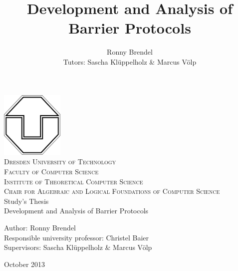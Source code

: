 \documentclass[a4paper, 10pt]{article}
\title{Development and Analysis of Barrier Protocols}
\author{Ronny Brendel\\Tutors: Sascha Kl\"uppelholz \& Marcus V\"olp}
\begin{document}

\begin{titlepage}

\begin{center}
\includegraphics[width=3cm]{tu-logo}~\\[1cm]
\textsc{\LARGE Dresden University of Technology}\\[0.5cm]
\textsc{\Large Faculty of Computer Science}\\[0.2cm]
\textsc{\large Institute of Theoretical Computer Science}\\[0.2cm]
\textsc{\large Chair for Algebraic and Logical Foundations of Computer Science}\\[3cm]
\Huge Study's Thesis \\[1cm]
\huge Development and Analysis of Barrier Protocols\\[3cm]
\end{center}

\begin{flushleft} \large
	Author: Ronny Brendel \\
	Responsible university professor: Christel Baier \\
	Supervisors: Sascha Kl\"uppelholz \& Marcus V\"olp
\end{flushleft}

\vfill
\begin{flushright}
	\large October 2013
\end{flushright}

\end{titlepage}

\pagebreak
\newpage \thispagestyle{empty} \mbox{}
\pagebreak
\end{document}
